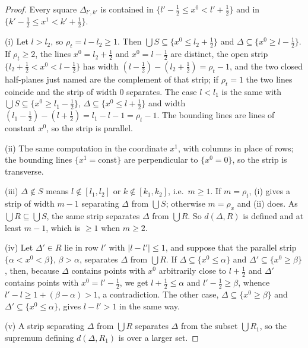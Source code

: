 \begin{proof}
Every square $\Delta_{l',k'}$ is contained in $\{l'-\frac12\le x^0<l'+\frac12\}$ and in
$\{k'-\frac12\le x^1<k'+\frac12\}$.

(i) Let $l>l_2$, so $\rho_t=l-l_2\ge1$.  Then $\bigcup S\subseteq\{x^0\le l_2+\frac12\}$ and
$\Delta\subseteq\{x^0\ge l-\frac12\}$.  If $\rho_t\ge2$, the lines $x^0=l_2+\frac12$ and
$x^0=l-\frac12$ are distinct, the open strip $\{l_2+\frac12<x^0<l-\frac12\}$ has width
$(l-\frac12)-(l_2+\frac12)=\rho_t-1$, and the two closed half-planes just named are the
complement of that strip; if $\rho_t=1$ the two lines coincide and the strip of width $0$
separates.  The case $l<l_1$ is the same with $\bigcup S\subseteq\{x^0\ge l_1-\frac12\}$,
$\Delta\subseteq\{x^0\le l+\frac12\}$ and width $(l_1-\frac12)-(l+\frac12)=l_1-l-1=\rho_t-1$.
The bounding lines are lines of constant $x^0$, so the strip is parallel.

(ii) The same computation in the coordinate $x^1$, with columns in place of rows; the
bounding lines $\{x^1=\text{const}\}$ are perpendicular to $\{x^0=0\}$, so the strip is
transverse.

(iii) $\Delta\notin S$ means $l\notin[l_1,l_2]$ or $k\notin[k_1,k_2]$, i.e.\ $m\ge1$.  If
$m=\rho_t$, (i) gives a strip of width $m-1$ separating $\Delta$ from $\bigcup S$;
otherwise $m=\rho_x$ and (ii) does.  As $\bigcup R\subseteq\bigcup S$, the same strip
separates $\Delta$ from $\bigcup R$.  So $d(\Delta,R)$ is defined and at least $m-1$, which
is $\ge1$ when $m\ge2$.

(iv) Let $\Delta'\in R$ lie in row $l'$ with $|l-l'|\le1$, and suppose that the parallel
strip $\{\alpha<x^0<\beta\}$, $\beta>\alpha$, separates $\Delta$ from $\bigcup R$.  If
$\Delta\subseteq\{x^0\le\alpha\}$ and $\Delta'\subseteq\{x^0\ge\beta\}$, then, because
$\Delta$ contains points with $x^0$ arbitrarily close to $l+\frac12$ and $\Delta'$ contains
points with $x^0=l'-\frac12$, we get $l+\frac12\le\alpha$ and $l'-\frac12\ge\beta$, whence
$l'-l\ge1+(\beta-\alpha)>1$, a contradiction.  The other case,
$\Delta\subseteq\{x^0\ge\beta\}$ and $\Delta'\subseteq\{x^0\le\alpha\}$, gives
$l-l'>1$ in the same way.

(v) A strip separating $\Delta$ from $\bigcup R$ separates $\Delta$ from the subset
$\bigcup R_1$, so the supremum defining $d(\Delta,R_1)$ is over a larger set.
\end{proof}

